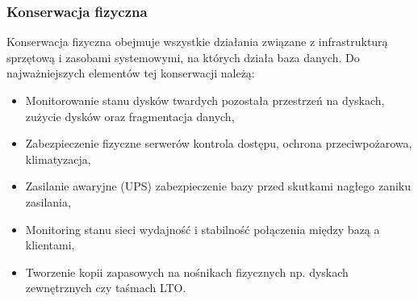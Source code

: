 \documentclass[a4paper,11pt,openany,english]{sphinxmanual}
\begin{document}
\subsubsection{Konserwacja fizyczna}
\label{\detokenize{rozdzial2/Kontrola_i_konserwacja/kontrola_i_konserwacja:konserwacja-fizyczna}}
\sphinxAtStartPar
Konserwacja fizyczna obejmuje wszystkie działania związane z infrastrukturą sprzętową i zasobami systemowymi, na których działa baza danych. Do najważniejszych elementów tej konserwacji należą:
\begin{itemize}
\item {} 
\sphinxAtStartPar
Monitorowanie stanu dysków twardych \textendash{} pozostała przestrzeń na dyskach, zużycie dysków oraz fragmentacja danych,

\item {} 
\sphinxAtStartPar
Zabezpieczenie fizyczne serwerów \textendash{} kontrola dostępu, ochrona przeciwpożarowa, klimatyzacja,

\item {} 
\sphinxAtStartPar
Zasilanie awaryjne (UPS) \sphinxhyphen{} zabezpieczenie bazy przed skutkami nagłego zaniku zasilania,

\item {} 
\sphinxAtStartPar
Monitoring stanu sieci \textendash{} wydajność i stabilność połączenia między bazą a klientami,

\item {} 
\sphinxAtStartPar
Tworzenie kopii zapasowych na nośnikach fizycznych \textendash{} np. dyskach zewnętrznych czy taśmach LTO.

\end{itemize}
\end{document}
